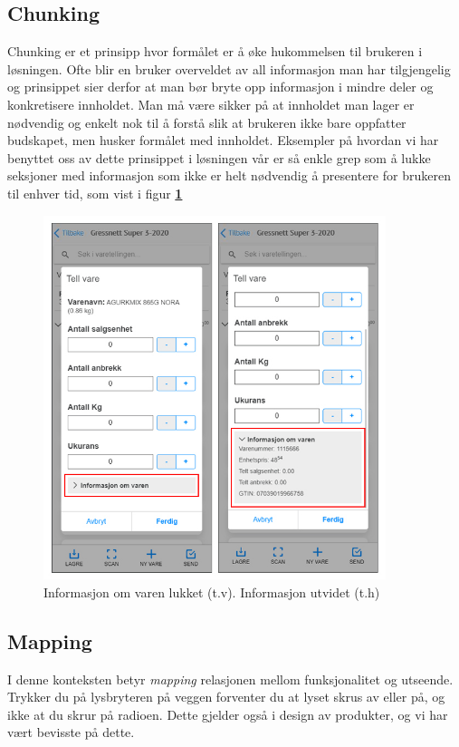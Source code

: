 \subsection{\textbf{Chunking}}
Chunking er et prinsipp hvor formålet er å øke hukommelsen til brukeren i løsningen. Ofte blir en bruker overveldet av all informasjon man har tilgjengelig og prinsippet sier derfor at man bør bryte opp informasjon i mindre deler og konkretisere innholdet. Man må være sikker på at innholdet man lager er nødvendig og enkelt nok til å forstå slik at brukeren ikke bare oppfatter budskapet, men husker formålet med innholdet. Eksempler på hvordan vi har benyttet oss av dette prinsippet i løsningen vår er så enkle grep som å lukke seksjoner med informasjon som ikke er helt nødvendig å presentere for brukeren til enhver tid, som vist i figur \textbf{\ref{Informasjon_lukket}}

\begin{figure}[H] 
    \centering
    \includegraphics[width=100mm]{figures/Design-utforming/information_collapsed.jpg}
    \caption{Informasjon om varen lukket (t.v). Informasjon utvidet (t.h)}
    \label{Informasjon_lukket}
\end{figure}

\subsection{\textbf{Mapping}}
I denne konteksten betyr \textit{mapping} relasjonen mellom funksjonalitet og utseende. Trykker du på lysbryteren på veggen forventer du at lyset skrus av eller på, og ikke at du skrur på radioen. Dette gjelder også i design av produkter, og vi har vært bevisste på dette.

